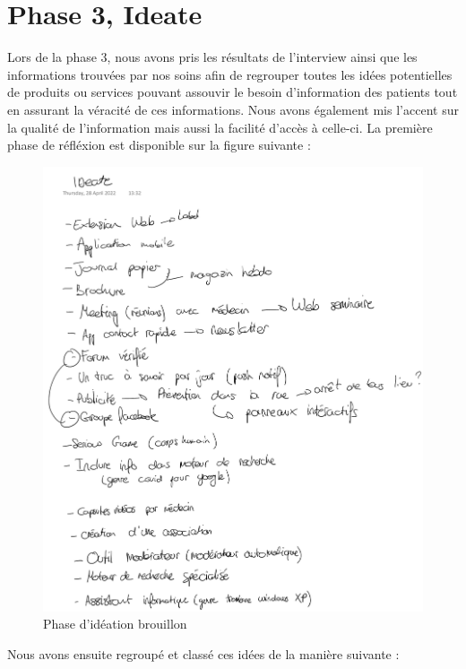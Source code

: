 \documentclass{ReportTemplate}
\begin{document}
\chapter{Phase 3, Ideate}
Lors de la phase 3, nous avons pris les résultats de l'interview ainsi que les
informations trouvées par nos soins afin de regrouper toutes les idées
potentielles de produits ou services pouvant assouvir le besoin d'information
des patients tout en assurant la véracité de ces informations. Nous avons
également mis l'accent sur la qualité de l'information mais aussi la facilité
d'accès à celle-ci. La première phase de réfléxion est disponible sur la figure
suivante :
\begin{figure}[H]
    \centering
    \includegraphics[width=\textwidth]{Annexes/Ideate_1.pdf}
    \caption{Phase d'idéation brouillon}
    \label{fig:Ideate1_brouillon}
\end{figure}
Nous avons ensuite regroupé et classé ces idées de la manière suivante :
\end{document}
